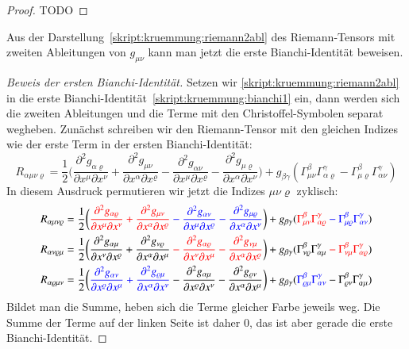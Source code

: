 \begin{proof}
TODO
\end{proof}

Aus der Darstellung~\eqref{skript:kruemmung:riemann2abl} des Riemann-Tensors
mit zweiten Ableitungen von $g_{\mu\nu}$ kann man jetzt die erste
Bianchi-Identität beweisen.

\begin{proof}[Beweis der ersten Bianchi-Identität]
Setzen wir \eqref{skript:kruemmung:riemann2abl} in die erste
Bianchi-Identität~\eqref{skript:kruemmung:bianchi1} ein, dann werden
sich die zweiten Ableitungen und die Terme mit den Christoffel-Symbolen
separat wegheben.
Zunächst schreiben wir den Riemann-Tensor mit den gleichen Indizes wie
der erste Term in der ersten Bianchi-Identität:
\begin{equation}
R_{\alpha\mu\nu\varrho}
=
\frac12\biggl(
\frac{\partial^2 g_{\alpha\varrho}}{\partial x^\mu\partial x^\nu}
+
\frac{\partial^2 g_{\mu\nu}}{\partial x^\alpha\partial x^\varrho}
-
\frac{\partial^2 g_{\alpha\nu}}{\partial x^\mu\partial x^\varrho}
-
\frac{\partial^2 g_{\mu\varrho}}{\partial x^\alpha\partial x^\nu}
\biggr)
+g_{\beta\gamma}(
\Gamma^\beta_{\mu\nu}\Gamma^\gamma_{\alpha\varrho}
-
\Gamma^\beta_{\mu\varrho}\Gamma^\gamma_{\alpha\nu}
)
\end{equation}
In diesem Ausdruck permutieren wir jetzt die Indizes $\mu\nu\varrho$
zyklisch:
\begin{align*}
R_{\alpha\mu\nu\varrho}
&=
\frac12\biggl(
{\color{red}
\frac{\partial^2 g_{\alpha\varrho}}{\partial x^\mu\partial x^\nu}
+
\frac{\partial^2 g_{\mu\nu}}{\partial x^\alpha\partial x^\varrho}}
{\color{blue}\mathstrut
-
\frac{\partial^2 g_{\alpha\nu}}{\partial x^\mu\partial x^\varrho}
-
\frac{\partial^2 g_{\mu\varrho}}{\partial x^\alpha\partial x^\nu}}
\biggr)
+g_{\beta\gamma}(
{\color{red}
\Gamma^\beta_{\mu\nu}\Gamma^\gamma_{\alpha\varrho}}
{\color{blue}\mathstrut
-
\Gamma^\beta_{\mu\varrho}\Gamma^\gamma_{\alpha\nu}}
)
\\
R_{\alpha\nu\varrho\mu}
&=
\frac12\biggl(
\frac{\partial^2 g_{\alpha\mu}}{\partial x^\nu\partial x^\varrho}
+
\frac{\partial^2 g_{\nu\varrho}}{\partial x^\alpha\partial x^\mu}
{\color{red}\mathstrut
-
\frac{\partial^2 g_{\alpha\varrho}}{\partial x^\nu\partial x^\mu}
-
\frac{\partial^2 g_{\nu\mu}}{\partial x^\alpha\partial x^\varrho}}
\biggr)
+g_{\beta\gamma}(
\Gamma^\beta_{\nu\varrho}\Gamma^\gamma_{\alpha\mu}
{\color{red}\mathstrut
-
\Gamma^\beta_{\nu\mu}\Gamma^\gamma_{\alpha\varrho}}
)
\\
R_{\alpha\varrho\mu\nu}
&=
\frac12\biggl(
{\color{blue}\mathstrut
\frac{\partial^2 g_{\alpha\nu}}{\partial x^\varrho\partial x^\mu}
+
\frac{\partial^2 g_{\varrho\mu}}{\partial x^\alpha\partial x^\nu}}
-
\frac{\partial^2 g_{\alpha\mu}}{\partial x^\varrho\partial x^\nu}
-
\frac{\partial^2 g_{\varrho\nu}}{\partial x^\alpha\partial x^\mu}
\biggr)
+g_{\beta\gamma}(
{\color{blue}
\Gamma^\beta_{\varrho\mu}\Gamma^\gamma_{\alpha\nu}}
-
\Gamma^\beta_{\varrho\nu}\Gamma^\gamma_{\alpha\mu}
)
\end{align*}
Bildet man die Summe, heben sich die Terme gleicher Farbe jeweils weg.
Die Summe der Terme auf der linken Seite ist daher $0$, das ist aber
gerade die erste Bianchi-Identität.
\end{proof}

